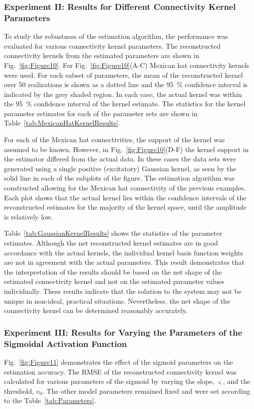 \documentclass[review,authoryear,3p]{elsarticle}
\begin{document}
\subsubsection{Experiment II: Results for Different Connectivity Kernel Parameters}
To study the robustness of the estimation algorithm, the performance was evaluated for various connectivity kernel parameters. The reconstructed connectivity kernels from the estimated parameters are shown in Fig.~\ref{fig:Figure10}. For Fig.~\ref{fig:Figure10}(A-C) Mexican hat connectivity kernels were used. For each subset of parameters, the mean of the reconstructed kernel over 50 realizations is shown as a dotted line and the 95~\% confidence interval is indicated by the grey shaded region. In each case, the actual kernel was within the 95~\% confidence interval of the kernel estimate. The statistics for the kernel parameter estimates for each of the parameter sets are shown in Table~\ref{tab:MexicanHatKernelResults}.

For each of the Mexican hat connectivities, the support of the kernel was assumed to be known. However, in Fig.~\ref{fig:Figure10}(D-F) the kernel support in the estimator differed from the actual data. In these cases the data sets were generated using a single positive (excitatory) Gaussian kernel, as seen by the solid line in each of the subplots of the figure. The estimation algorithm was constructed allowing for the Mexican hat connectivity of the previous examples. Each plot shows that the actual kernel lies within the confidence intervals of the reconstructed estimates for the majority of the kernel space, until the amplitude is relatively low.

Table~\ref{tab:GaussianKernelResults} shows the statistics of the parameter estimates. Although the net reconstructed kernel estimates are in good accordance with the actual kernels, the individual kernel basis function weights are not in agreement with the actual parameters. This result demonstrates that the interpretation of the results should be based on the net shape of the estimated connectivity kernel and not on the estimated parameter values individually. These results indicate that the solution to the system may not be unique in non-ideal, practical situations. Nevertheless, the net shape of the connectivity kernel can be determined reasonably accurately.

\subsubsection{Experiment III: Results for Varying the Parameters of the Sigmoidal Activation Function}
Fig.~\ref{fig:Figure11} demonstrates the effect of the sigmoid parameters on the estimation accuracy. The RMSE of the reconstructed connectivity kernel was calculated for various parameters of the sigmoid by varying the slope, $\varsigma$, and the threshold, $v_0$. The other model parameters remained fixed and were set according to the Table~\ref{tab:Parameters}.
\end{document}
